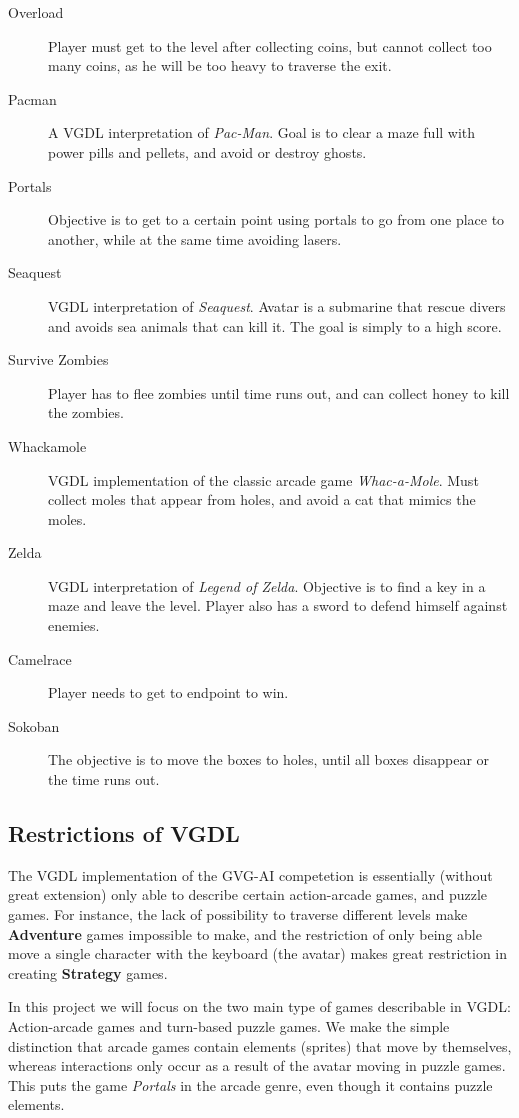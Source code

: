 \documentclass[a4paper,titlepage,final, twoside]{report}
\begin{document}
\begin{description}
\item [Overload] Player must get to the level after collecting coins, but cannot collect too many coins, as he will be too heavy to traverse the exit.
\item [Pacman] A VGDL interpretation of \emph{Pac-Man}. Goal is to clear a maze full with power pills and pellets, and avoid or destroy ghosts.
\item [Portals] Objective is to get to a certain point using portals to go from one place to another, while at the same time avoiding lasers.
\item [Seaquest] VGDL interpretation of \emph{Seaquest}. Avatar is a submarine that rescue divers and avoids sea animals that can kill it. The goal is simply to a high score.
\item [Survive Zombies] Player has to flee zombies until time runs out, and can collect honey to kill the zombies.
\item [Whackamole] VGDL implementation of the classic arcade game \emph{Whac-a-Mole}. Must collect moles that appear from holes, and avoid a cat that mimics the moles.
\item [Zelda] VGDL interpretation of \emph{Legend of Zelda}. Objective is to find a key in a maze and leave the level. Player also has a sword to defend himself against enemies.
\item [Camelrace] Player needs to get to endpoint to win.
\item [Sokoban] The objective is to move the boxes to holes, until all boxes disappear or the time runs out.
\end{description}


\subsection{Restrictions of VGDL}
\label{ssec_gamegenres}
The VGDL implementation of the GVG-AI competetion is essentially (without great extension) only able to describe certain action-arcade games, and puzzle games.
For instance, the lack of possibility to traverse different levels make \textbf{Adventure} games impossible to make, and the restriction of only being able move a single character with the keyboard (the avatar) makes great restriction in creating \textbf{Strategy} games.

In this project we will focus on the two main type of games describable in VGDL: Action-arcade games and turn-based puzzle games. We make the simple distinction that arcade games contain elements (sprites) that move by themselves, whereas interactions only occur as a result of the avatar moving in puzzle games.
This puts the game \emph{Portals} in the arcade genre, even though it contains puzzle elements.
\end{document}
